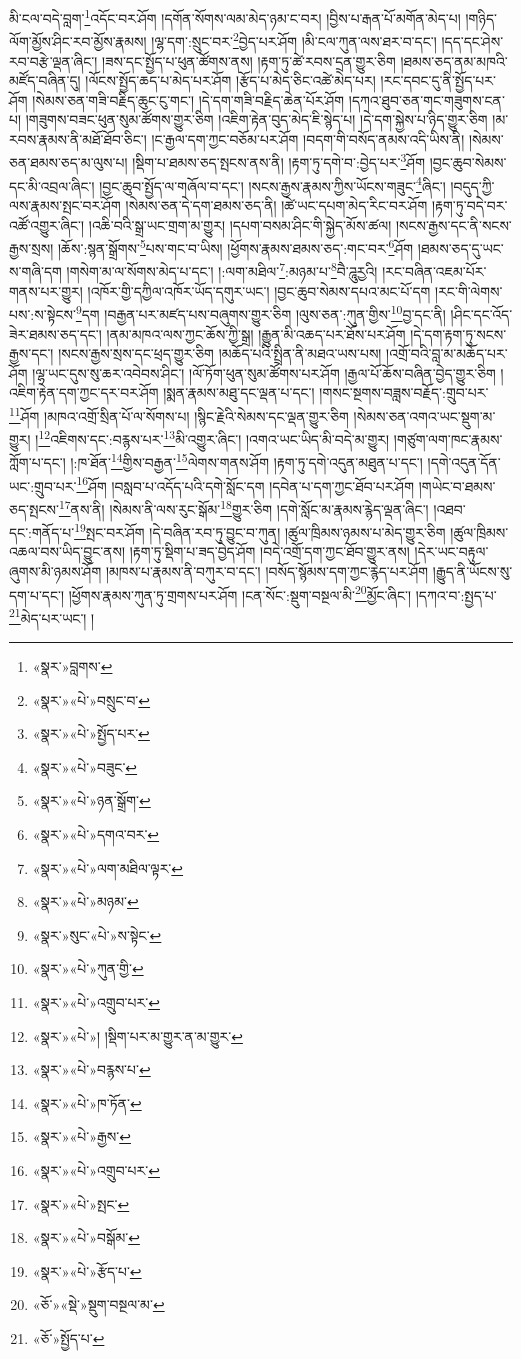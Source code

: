 མི་ངལ་བདེ་བླག་\footnote{«སྣར་»བླགས་}འདོང་བར་ཤོག །དགོན་སོགས་ལམ་མེད་ཉམ་ང་བར། །བྱིས་པ་རྒན་པོ་མགོན་མེད་པ། །གཉིད་ལོག་མྱོས་ཤིང་རབ་མྱོས་རྣམས། །ལྷ་དག་:སྲུང་བར་\footnote{«སྣར་»«པེ་»བསྲུང་བ་}བྱེད་པར་ཤོག །མི་ངལ་ཀུན་ལས་ཐར་བ་དང་། །དད་དང་ཤེས་རབ་བརྩེ་ལྡན་ཞིང་། །ཟས་དང་སྤྱོད་པ་ཕུན་ཚོགས་ནས། །རྟག་ཏུ་ཚེ་རབས་དྲན་གྱུར་ཅིག །ཐམས་ཅད་ནམ་མཁའི་མཛོད་བཞིན་དུ། །ལོངས་སྤྱོད་ཆད་པ་མེད་པར་ཤོག །རྩོད་པ་མེད་ཅིང་འཚེ་མེད་པར། །རང་དབང་དུ་ནི་སྤྱོད་པར་ཤོག །སེམས་ཅན་གཟི་བརྗིད་ཆུང་ངུ་གང་། །དེ་དག་གཟི་བརྗིད་ཆེན་པོར་ཤོག །དཀའ་ཐུབ་ཅན་གང་གཟུགས་ངན་པ། །གཟུགས་བཟང་ཕུན་སུམ་ཚོགས་གྱུར་ཅིག །འཇིག་རྟེན་བུད་མེད་ཇི་སྙེད་པ། །དེ་དག་སྐྱེས་པ་ཉིད་གྱུར་ཅིག །མ་རབས་རྣམས་ནི་མཐོ་ཐོབ་ཅིང་། །ང་རྒྱལ་དག་ཀྱང་བཅོམ་པར་ཤོག །བདག་གི་བསོད་ནམས་འདི་ཡིས་ནི། །སེམས་ཅན་ཐམས་ཅད་མ་ལུས་པ། །སྡིག་པ་ཐམས་ཅད་སྤངས་ནས་ནི། །རྟག་ཏུ་དགེ་བ་:བྱེད་པར་\footnote{«སྣར་»«པེ་»སྤྱོད་པར་}ཤོག །བྱང་ཆུབ་སེམས་དང་མི་འབྲལ་ཞིང་། །བྱང་ཆུབ་སྤྱོད་ལ་གཞོལ་བ་དང་། །སངས་རྒྱས་རྣམས་ཀྱིས་ཡོངས་གཟུང་\footnote{«སྣར་»«པེ་»བཟུང་}ཞིང་། །བདུད་ཀྱི་ལས་རྣམས་སྤང་བར་ཤོག །སེམས་ཅན་དེ་དག་ཐམས་ཅད་ནི། །ཚེ་ཡང་དཔག་མེད་རིང་བར་ཤོག །རྟག་ཏུ་བདེ་བར་འཚོ་འགྱུར་ཞིང་། །འཆི་བའི་སྒྲ་ཡང་གྲག་མ་གྱུར། །དཔག་བསམ་ཤིང་གི་སྐྱེད་མོས་ཚལ། །སངས་རྒྱས་དང་ནི་སངས་རྒྱས་སྲས། །ཆོས་:སྙན་སྒྲོགས་\footnote{«སྣར་»«པེ་»ཉན་སྒྲོག་}པས་གང་བ་ཡིས། །ཕྱོགས་རྣམས་ཐམས་ཅད་:གང་བར་\footnote{«སྣར་»«པེ་»དགའ་བར་}ཤོག །ཐམས་ཅད་དུ་ཡང་ས་གཞི་དག །གསེག་མ་ལ་སོགས་མེད་པ་དང་། །:ལག་མཐིལ་\footnote{«སྣར་»«པེ་»ལག་མཐིལ་ལྟར་}:མཉམ་པ་\footnote{«སྣར་»«པེ་»མཉམ་}བཻ་ཌཱུརྱའི། །རང་བཞིན་འཇམ་པོར་གནས་པར་གྱུར། །འཁོར་གྱི་དཀྱིལ་འཁོར་ཡོད་དགུར་ཡང་། །བྱང་ཆུབ་སེམས་དཔའ་མང་པོ་དག །རང་གི་ལེགས་པས་:ས་སྟེངས་\footnote{«སྣར་»སུང་«པེ་»ས་སྟེང་}དག །བརྒྱན་པར་མཛད་པས་བཞུགས་གྱུར་ཅིག །ལུས་ཅན་:ཀུན་གྱིས་\footnote{«སྣར་»«པེ་»ཀུན་གྱི་}བྱ་དང་ནི། །ཤིང་དང་འོད་ཟེར་ཐམས་ཅད་དང་། །ནམ་མཁའ་ལས་ཀྱང་ཆོས་ཀྱི་སྒྲ། །རྒྱུན་མི་འཆད་པར་ཐོས་པར་ཤོག །དེ་དག་རྟག་ཏུ་སངས་རྒྱས་དང་། །སངས་རྒྱས་སྲས་དང་ཕྲད་གྱུར་ཅིག །མཆོད་པའི་སྤྲིན་ནི་མཐའ་ཡས་པས། །འགྲོ་བའི་བླ་མ་མཆོད་པར་ཤོག །ལྷ་ཡང་དུས་སུ་ཆར་འབེབས་ཤིང་། །ལོ་ཏོག་ཕུན་སུམ་ཚོགས་པར་ཤོག །རྒྱལ་པོ་ཆོས་བཞིན་བྱེད་གྱུར་ཅིག །འཇིག་རྟེན་དག་ཀྱང་དར་བར་ཤོག །སྨན་རྣམས་མཐུ་དང་ལྡན་པ་དང་། །གསང་སྔགས་བཟླས་བརྗོད་:གྲུབ་པར་\footnote{«སྣར་»«པེ་»འགྲུབ་པར་}ཤོག །མཁའ་འགྲོ་སྲིན་པོ་ལ་སོགས་པ། །སྙིང་རྗེའི་སེམས་དང་ལྡན་གྱུར་ཅིག །སེམས་ཅན་འགའ་ཡང་སྡུག་མ་གྱུར། །\footnote{«སྣར་»«པེ་»། །སྡིག་པར་མ་གྱུར་ན་མ་གྱུར་}འཇིགས་དང་:བརྙས་པར་\footnote{«སྣར་»«པེ་»བརྙས་པ་}མི་འགྱུར་ཞིང་། །འགའ་ཡང་ཡིད་མི་བདེ་མ་གྱུར། །གཙུག་ལག་ཁང་རྣམས་ཀློག་པ་དང་། །:ཁ་ཐོན་\footnote{«སྣར་»«པེ་»ཁ་ཏོན་}གྱིས་བརྒྱན་\footnote{«སྣར་»«པེ་»རྒྱས་}ལེགས་གནས་ཤོག །རྟག་ཏུ་དགེ་འདུན་མཐུན་པ་དང་། །དགེ་འདུན་དོན་ཡང་:གྲུབ་པར་\footnote{«སྣར་»«པེ་»འགྲུབ་པར་}ཤོག །བསླབ་པ་འདོད་པའི་དགེ་སློང་དག །དབེན་པ་དག་ཀྱང་ཐོབ་པར་ཤོག །གཡེང་བ་ཐམས་ཅད་སྤངས་\footnote{«སྣར་»«པེ་»སྤང་}ནས་ནི། །སེམས་ནི་ལས་རུང་སྒོམ་\footnote{«སྣར་»«པེ་»བསྒོམ་}གྱུར་ཅིག །དགེ་སློང་མ་རྣམས་རྙེད་ལྡན་ཞིང་། །འཐབ་དང་:གནོད་པ་\footnote{«སྣར་»«པེ་»རྩོད་པ་}སྤང་བར་ཤོག །དེ་བཞིན་རབ་ཏུ་བྱུང་བ་ཀུན། །ཚུལ་ཁྲིམས་ཉམས་པ་མེད་གྱུར་ཅིག །ཚུལ་ཁྲིམས་འཆལ་བས་ཡིད་བྱུང་ནས། །རྟག་ཏུ་སྡིག་པ་ཟད་བྱེད་ཤོག །བདེ་འགྲོ་དག་ཀྱང་ཐོབ་གྱུར་ནས། །དེར་ཡང་བརྟུལ་ཞུགས་མི་ཉམས་ཤོག །མཁས་པ་རྣམས་ནི་བཀུར་བ་དང་། །བསོད་སྙོམས་དག་ཀྱང་རྙེད་པར་ཤོག །རྒྱུད་ནི་ཡོངས་སུ་དག་པ་དང་། །ཕྱོགས་རྣམས་ཀུན་ཏུ་གྲགས་པར་ཤོག །ངན་སོང་:སྡུག་བསྔལ་མི་\footnote{«ཅོ་»«སྡེ་»སྡུག་བསྔལ་མ་}མྱོང་ཞིང་། །དཀའ་བ་:སྤྱད་པ་\footnote{«ཅོ་»སྤྱོད་པ་}མེད་པར་ཡང་། །
